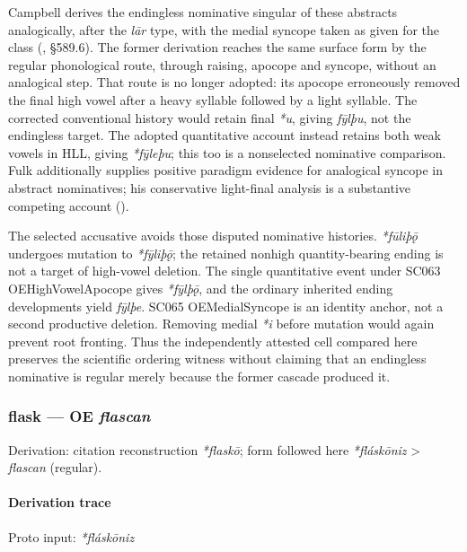 \documentclass[
  british,
  a4paper,
]{article}
\begin{document}
Campbell derives the endingless nominative singular of these abstracts
analogically, after the \emph{lār} type, with the medial syncope taken
as given for the class (,
§589.6). The former derivation reaches the same surface form by the
regular phonological route, through raising, apocope and syncope,
without an analogical step. That route is no longer adopted: its apocope
erroneously removed the final high vowel after a heavy syllable followed
by a light syllable. The corrected conventional history would retain
final \emph{*u}, giving \emph{fȳlþu}, not the endingless target. The
adopted quantitative account instead retains both weak vowels in HLL,
giving \emph{*fȳleþu}; this too is a nonselected nominative comparison.
Fulk additionally supplies positive paradigm evidence for analogical
syncope in abstract nominatives; his conservative light-final analysis
is a substantive competing account ().

The selected accusative avoids those disputed nominative histories.
\emph{*fūliþǭ} undergoes mutation to \emph{*fȳliþǭ}; the retained
nonhigh quantity-bearing ending is not a target of high-vowel deletion.
The single quantitative event under SC063 OEHighVowelApocope gives
\emph{*fȳlþǭ}, and the ordinary inherited ending developments yield
\emph{fȳlþe}. SC065 OEMedialSyncope is an identity anchor, not a second
productive deletion. Removing medial \emph{*i} before mutation would
again prevent root fronting. Thus the independently attested cell
compared here preserves the scientific ordering witness without claiming
that an endingless nominative is regular merely because the former
cascade produced it.

\subsubsection{\texorpdfstring{flask --- OE
\emph{flascan}}{flask --- OE flascan}}\label{flask-oe-flascan}

Derivation: citation reconstruction \emph{*flaskō}; form followed here
\emph{*fláskōniz} \textgreater{} \emph{flascan} (regular).

\paragraph{Derivation trace}\label{derivation-trace-25}

Proto input: \emph{*fláskōniz}

\begingroup
\setlength{\fboxsep}{6pt}
\end{document}
